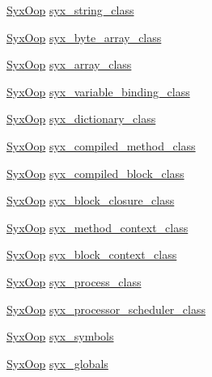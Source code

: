 \begin{CompactItemize}
\item 
\hyperlink{syx-types_8h_1121caba2d40b2ce090b640762744ccd}{SyxOop} \hyperlink{syx-object_8c_3ecb65cb20e0a5a895c3b5ff2f8b2c0b}{syx\_\-string\_\-class}
\item 
\hyperlink{syx-types_8h_1121caba2d40b2ce090b640762744ccd}{SyxOop} \hyperlink{syx-object_8c_b692d37a746506811e13db448cc5f10a}{syx\_\-byte\_\-array\_\-class}
\item 
\hyperlink{syx-types_8h_1121caba2d40b2ce090b640762744ccd}{SyxOop} \hyperlink{syx-object_8c_ea3c80e36d52b2e7d2988a3e862673cb}{syx\_\-array\_\-class}
\item 
\hyperlink{syx-types_8h_1121caba2d40b2ce090b640762744ccd}{SyxOop} \hyperlink{syx-object_8c_6e0e5c8e64c8634d625651aa9f73e690}{syx\_\-variable\_\-binding\_\-class}
\item 
\hyperlink{syx-types_8h_1121caba2d40b2ce090b640762744ccd}{SyxOop} \hyperlink{syx-object_8c_dd15828b4f6578c666ac5fcea0f1e48c}{syx\_\-dictionary\_\-class}
\item 
\hyperlink{syx-types_8h_1121caba2d40b2ce090b640762744ccd}{SyxOop} \hyperlink{syx-object_8c_3fbdf382946e90aa0f7344bf731bf4a8}{syx\_\-compiled\_\-method\_\-class}
\item 
\hyperlink{syx-types_8h_1121caba2d40b2ce090b640762744ccd}{SyxOop} \hyperlink{syx-object_8c_f43d738ba7c8d9abc962067fb526cedd}{syx\_\-compiled\_\-block\_\-class}
\item 
\hyperlink{syx-types_8h_1121caba2d40b2ce090b640762744ccd}{SyxOop} \hyperlink{syx-object_8c_fd7f46b7f1e4ade8fa8b0583e53191e4}{syx\_\-block\_\-closure\_\-class}
\item 
\hyperlink{syx-types_8h_1121caba2d40b2ce090b640762744ccd}{SyxOop} \hyperlink{syx-object_8c_e2242d95390ddfa0dadc10d7b41b65f9}{syx\_\-method\_\-context\_\-class}
\item 
\hyperlink{syx-types_8h_1121caba2d40b2ce090b640762744ccd}{SyxOop} \hyperlink{syx-object_8c_10eccfc9fce175592c0b2a43953da5e3}{syx\_\-block\_\-context\_\-class}
\item 
\hyperlink{syx-types_8h_1121caba2d40b2ce090b640762744ccd}{SyxOop} \hyperlink{syx-object_8c_0d597252f524ea69dd0bf8f33b3cec01}{syx\_\-process\_\-class}
\item 
\hyperlink{syx-types_8h_1121caba2d40b2ce090b640762744ccd}{SyxOop} \hyperlink{syx-object_8c_cc2d7608228c4fd75d822841f0f32125}{syx\_\-processor\_\-scheduler\_\-class}
\item 
\hyperlink{syx-types_8h_1121caba2d40b2ce090b640762744ccd}{SyxOop} \hyperlink{syx-object_8c_4b5e97a130b1cf431ef9ea589afc5cfc}{syx\_\-symbols}
\item 
\hyperlink{syx-types_8h_1121caba2d40b2ce090b640762744ccd}{SyxOop} \hyperlink{syx-object_8c_1e96747d8e7efd0baede821f1d34b9db}{syx\_\-globals}
\end{CompactItemize}


